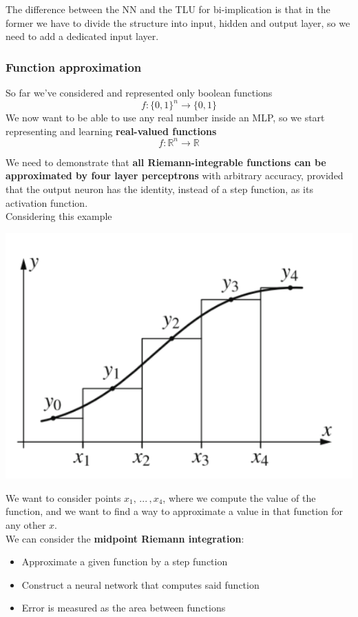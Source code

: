 The difference between the NN and the TLU for bi-implication is that in the former we have to divide the structure into input, hidden and output layer, so we need to add a dedicated input layer.\\

\newpage

\subsubsection{Function approximation}

So far we've considered and represented only boolean functions 
$$ f: \{0,1\}^n \rightarrow \{0,1\} $$
We now want to be able to use any real number inside an MLP, so we start representing and learning \textbf{real-valued functions}
$$ f: \mathbb{R}^n \rightarrow \mathbb{R} $$

We need to demonstrate that \textbf{all Riemann-integrable functions can be approximated by four layer perceptrons} with arbitrary accuracy, provided that the output neuron has the identity, instead of a step function, as its activation function.\\

Considering this example
\begin{center}
	\includegraphics[width=0.5\columnwidth]{img/NN/func1}
\end{center}
We want to consider points $x_1, \, ... \, , x_4$, where we compute the value of the function, and we want to find a way to approximate a value in that function for any other $x$.\\

We can consider the \textbf{midpoint Riemann integration}: 
\begin{itemize}
	\item Approximate a given function by a step function
	\item Construct a neural network that computes said function 
	\item Error is measured as the area between functions
\end{itemize}

